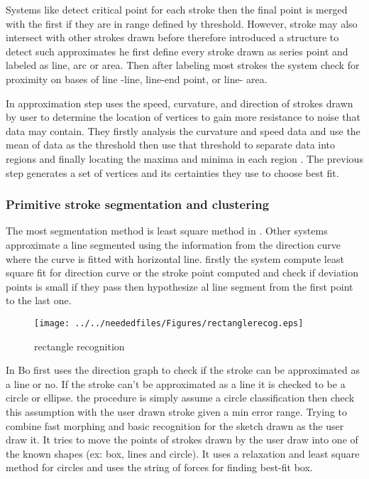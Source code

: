 Systems like \cite{physicalmeaning6} detect critical point for each stroke then the final point is merged with the first if they are in range defined by threshold. However, stroke may also intersect with other strokes drawn before therefore \cite{physicalmeaning6}  introduced a structure to detect such approximates he first define every stroke drawn as series point and labeled as line, arc or area. Then after labeling most strokes the system check for proximity on bases of line -line, line-end point, or line- area. 


In   \cite {meanshift10,domainindependent17}   approximation step uses the speed, curvature, and direction of strokes drawn by user to determine the location of vertices to gain more resistance to noise that data may contain. They firstly analysis the curvature and speed data and use the mean of data as the threshold then use that threshold to separate data into regions and finally locating the maxima and minima in each region . The previous step generates a set of vertices and its certainties they use to choose best fit.

\subsubsection {Primitive stroke segmentation and clustering}
\label{sec:Primitivestrokesegmentationandclustering}

The most segmentation method is least square method in \cite {overtraced24}. Other systems  approximate a line segmented using the information from the direction curve where the curve is fitted with horizontal line. firstly the system compute least square fit for direction curve or the stroke point computed and check if deviation points is small if they pass then hypothesize al line segment  from the first point to the last one. 

\begin{figure}
	\centering
		\texttt{[image: ../../neededfiles/Figures/rectanglerecog.eps]}
	\caption{rectangle recognition}
	\label{fig:rectanglerecog}
\end{figure}

 In \cite {meanshift10,domainindependent17}  Bo first uses the direction graph to check if the stroke can be approximated as a line or no. If the stroke can't be approximated as a line it is checked to be a circle or ellipse. the procedure is simply assume a circle classification then check this assumption with the user drawn stroke given a min error range.  
\cite {Fluid25} Trying to combine fast morphing and basic recognition for the sketch drawn as the user draw it. It tries to move the points of strokes drawn by the user draw into one of the known shapes (ex: box, lines and circle). It uses a relaxation and least square method for circles and uses the string of forces for finding best-fit box.

